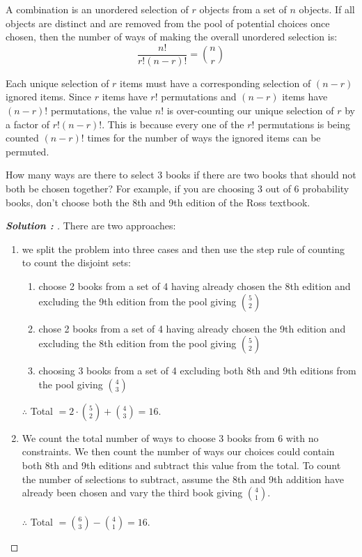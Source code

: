 \documentclass[11pt]{article}
\newenvironment{solution}[1][]{%
  \renewcommand\qedsymbol{$\blacksquare$}%
  \def\temp{\normalfont\bfseries Solution \theexample: #1}
  \begin{proof}[\temp]
  \normalfont %
}{%
  \end{proof}
}
\begin{document}
\begin{definition}[Combinations]
  A combination is an unordered selection of $r$ objects from a set of $n$ objects. If all objects are distinct and are removed from the pool of potential
  choices once chosen, then the number of ways of making the overall unordered selection is:
  $$\frac{n!}{r!(n-r)!} = \binom{n}{r}$$
\end{definition}
Each unique selection of $r$ items must have a corresponding selection of $(n-r)$ ignored items. Since $r$ items have $r!$ permutations and
$(n-r)$ items have $(n-r)!$ permutations, the value $n!$ is over-counting our unique selection of $r$ by a factor of $r!(n-r)!$. This is because
every one of the $r!$ permutations is being counted $(n-r)!$ times for the number of ways the ignored items can be permuted. 
\newpage
\begin{example}
  How many ways are there to select 3 books if there are two books that should not both be chosen together? For example, if you are choosing 3 out of 6
  probability books, don't choose both the 8th and 9th edition of the Ross textbook.
\end{example}
\begin{solution}
  There are two approaches:
  \begin{enumerate}
    \item we split the problem into three cases and then use the step rule of counting to count the disjoint sets:
          \begin{enumerate}[label=\alph*)]
            \item choose 2 books from a set of 4 having already chosen the 8th edition and excluding the 9th edition from the pool giving $\binom{5}{2}$
            \item chose 2 books from a set of 4 having already chosen the 9th edition and excluding the 8th edition from the pool giving $\binom{5}{2}$
            \item choosing 3 books from a set of 4 excluding both 8th and 9th editions from the pool giving $\binom{4}{3}$
          \end{enumerate}
          $\therefore$ Total $= 2 \cdot \binom{5}{2} + \binom{4}{3} = 16$.
    
    \item We count the total number of ways to choose 3 books from 6 with no constraints. We then count the number of ways our choices could contain
          both 8th and 9th editions and subtract this value from the total. To count the number of selections to subtract, assume the 8th and 9th addition
          have already been chosen and vary the third book giving $\binom{4}{1}$.\\\\
          $\therefore$ Total $= \binom{6}{3} - \binom{4}{1} = 16$.
  \end{enumerate}
\end{solution}
\end{document}
